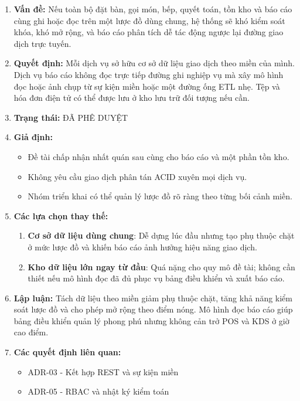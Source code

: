 \documentclass[11pt,a4paper]{article}
\begin{document}
\begin{adrbox}[title={ADR-04: Tách Dữ Liệu Theo Miền Nghiệp Vụ Và Dùng Read Model Cho Báo Cáo}]
\begin{enumerate}[leftmargin=1.9em,label=\arabic*.]
  \item \textbf{Vấn đề:} Nếu toàn bộ đặt bàn, gọi món, bếp, quyết toán, tồn kho và báo cáo cùng ghi hoặc đọc trên một lược đồ dùng chung, hệ thống sẽ khó kiểm soát khóa, khó mở rộng, và báo cáo phân tích dễ tác động ngược lại đường giao dịch trực tuyến.
  \item \textbf{Quyết định:} Mỗi dịch vụ sở hữu cơ sở dữ liệu giao dịch theo miền của mình. Dịch vụ báo cáo không đọc trực tiếp đường ghi nghiệp vụ mà xây mô hình đọc hoặc ảnh chụp từ sự kiện miền hoặc một đường ống ETL nhẹ. Tệp và hóa đơn điện tử có thể được lưu ở kho lưu trữ đối tượng nếu cần.
  \item \textbf{Trạng thái:} ĐÃ PHÊ DUYỆT
  \item \textbf{Giả định:}
  \begin{itemize}[leftmargin=1.8em]
    \item Đề tài chấp nhận nhất quán sau cùng cho báo cáo và một phần tồn kho.
    \item Không yêu cầu giao dịch phân tán ACID xuyên mọi dịch vụ.
    \item Nhóm triển khai có thể quản lý lược đồ rõ ràng theo từng bối cảnh miền.
  \end{itemize}
  \item \textbf{Các lựa chọn thay thế:}
  \begin{enumerate}[label=(\alph*),leftmargin=2.1em]
    \item \textbf{Cơ sở dữ liệu dùng chung}: Dễ dựng lúc đầu nhưng tạo phụ thuộc chặt ở mức lược đồ và khiến báo cáo ảnh hưởng hiệu năng giao dịch.
    \item \textbf{Kho dữ liệu lớn ngay từ đầu}: Quá nặng cho quy mô đề tài; không cần thiết nếu mô hình đọc đã đủ phục vụ bảng điều khiển và xuất báo cáo.
  \end{enumerate}
  \item \textbf{Lập luận:} Tách dữ liệu theo miền giảm phụ thuộc chặt, tăng khả năng kiểm soát lược đồ và cho phép mở rộng theo điểm nóng. Mô hình đọc báo cáo giúp bảng điều khiển quản lý phong phú nhưng không cản trở POS và KDS ở giờ cao điểm.
  \item \textbf{Các quyết định liên quan:}
  \begin{itemize}[leftmargin=1.8em]
    \item ADR-03 - Kết hợp REST và sự kiện miền
    \item ADR-05 - RBAC và nhật ký kiểm toán
  \end{itemize}
\end{enumerate}
\end{adrbox}
\end{document}

